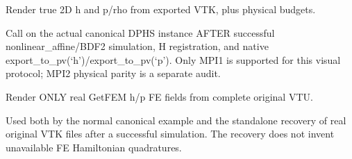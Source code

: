 \documentclass[letterpaper,10pt,english]{sphinxmanual}
\begin{document}
\begin{fulllineitems}
\label{\detokenize{examples/shallow_water:examples.shallow_water.render_native_shallow_water}}
\pysigstartsignatures
\pysiglinewithargsret
{}
{\sphinxparamcomma {}\sphinxparamcomma {}\sphinxparamcomma {}\sphinxparamcomma {}}
{}
\pysigstopsignatures
\sphinxAtStartPar
Render true 2\sphinxhyphen{}D h and p/rho from exported VTK, plus physical budgets.

\sphinxAtStartPar
Call on the actual canonical DPHS instance AFTER successful
nonlinear\_affine/BDF2 simulation, H registration, and native
export\_to\_pv(‘h’)/export\_to\_pv(‘p’). Only MPI1 is supported for
this visual protocol; MPI2 physical parity is a separate audit.

\end{fulllineitems}


\begin{fulllineitems}
\label{\detokenize{examples/shallow_water:examples.shallow_water.render_original_shallow_water_spatial_VTU}}
\pysigstartsignatures
\pysiglinewithargsret
{}
{\sphinxparamcomma {}\sphinxparamcomma {}\sphinxparamcomma {}\sphinxparamcomma {}\sphinxparamcomma {}\sphinxparamcomma {}}
{}
\pysigstopsignatures
\sphinxAtStartPar
Render ONLY real GetFEM h/p FE fields from complete original VTU.

\sphinxAtStartPar
Used both by the normal canonical example and the standalone
recovery of real original VTK files after a successful simulation.
The recovery does not invent unavailable FE Hamiltonian quadratures.

\end{fulllineitems}
\end{document}
